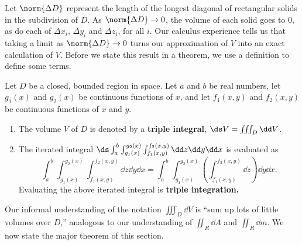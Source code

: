 Let $\norm{\Delta D}$ represent the length of the longest diagonal of rectangular solids in the subdivision of $D$. As $\norm{\Delta D}\to 0$, the volume of each solid goes to 0, as do each of $\Delta x_i$, $\Delta y_i$ and $\Delta z_i$, for all $i$. Our calculus experience tells us that taking a limit as $\norm{\Delta D}\to 0$ turns our approximation of $V$ into an exact calculation of $V$. Before we state this result in a theorem, we use a definition to define some terms.

{
\begin{definition}\label{def:triple_integral}%
Let $D$ be a closed, bounded region in space. Let $a$ and $b$ be real numbers, let $g_1(x)$ and $g_2(x)$ be continuous functions of $x$, and let $f_1(x,y)$ and $f_2(x,y)$ be continuous functions of $x$ and $y$.
\begin{enumerate}
	\item	The volume $V$ of $D$ is denoted by a \textbf{triple integral},
	$\ds V = \iiint_D\dd V$.
	
	\item The iterated integral $\ds \int_a^b\int_{g_1(x)}^{g_2(x)}\int_{f_1(x,y)}^{f_2(x,y)} \dd z\dd y\dd x$ is evaluated as 
	\[\int_a^b\int_{g_1(x)}^{g_2(x)}\int_{f_1(x,y)}^{f_2(x,y)} \dd z\dd y\dd x=\int_a^b\int_{g_1(x)}^{g_2(x)}\left(\int_{f_1(x,y)}^{f_2(x,y)} \dd z\right)\dd y\dd x.\]
	Evaluating the above iterated integral is \textbf{triple integration.}
\end{enumerate}
\end{definition}
}

Our informal understanding of the notation $\iiint_D\dd V$ is ``sum up lots of little volumes over $D$,'' analogous to our understanding of $\iint_R\dd A$ and $\iint_R\dd m$. We now state the major theorem of this section.

